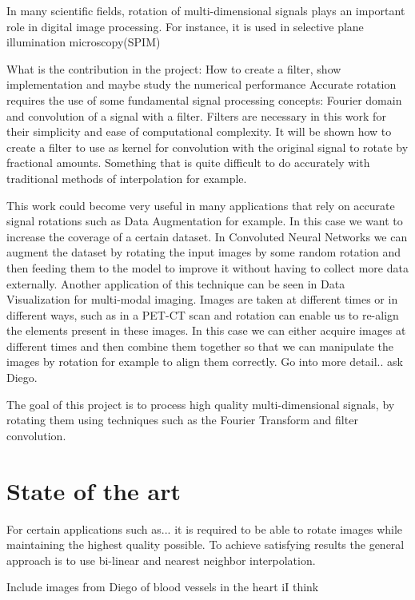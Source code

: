 \documentclass[]{usiinfbachelorproject}
\begin{document}
	
	In many scientific fields, rotation of multi-dimensional signals plays an important role in digital image processing. For instance, it is used in selective plane illumination microscopy(SPIM)
	
	What is the contribution in the project: How to create a filter, show implementation and maybe study the numerical performance
	Accurate rotation requires the use of some fundamental signal processing concepts: Fourier domain and convolution of a signal with a filter. Filters are necessary in this work for their simplicity and ease of computational complexity. It will be shown how to create a filter to use as kernel for convolution with the original signal to rotate by fractional amounts. Something that is quite difficult to do accurately with traditional methods of interpolation for example. 
	
	
	This work could become very useful in many applications that rely on accurate signal rotations such as Data Augmentation for example. In this case we want to increase the coverage of a certain dataset. In Convoluted Neural Networks we can augment the dataset by rotating the input images by some random rotation and then feeding them to the model to improve it without having to collect more data externally.
	Another application of this technique can be seen in Data Visualization for multi-modal imaging. Images are taken at different times or in different ways, such as in a PET-CT scan and rotation can enable us to re-align the elements present in these images. In this case we can either acquire images at different times and then combine them together so that we can manipulate the images by rotation for example to align them correctly. Go into more detail.. ask Diego.
	
	The goal of this project is to process high quality multi-dimensional signals, by rotating them using techniques such as the Fourier Transform and filter convolution.
	
	
	
	
	\section{State of the art}
	For certain applications such as... it is required to be able to rotate images while maintaining the highest quality possible. To achieve satisfying results the general approach is to use bi-linear and nearest neighbor interpolation.
	
	
	Include images from Diego of blood vessels in the heart iI think
	
\end{document}
